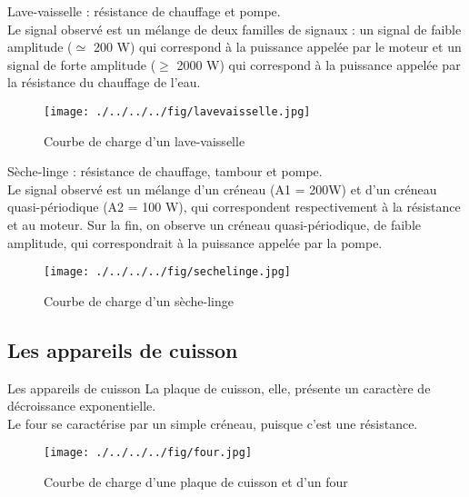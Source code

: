 \documentclass{beamer}
\begin{document}
\begin{frame}
Lave-vaisselle : résistance de chauffage et pompe.\\
\vspace{0.25cm}
Le signal observé est un mélange de deux familles de signaux : un signal de faible amplitude ($\simeq$ 200 W) qui correspond à la puissance appelée par le moteur et un signal de forte amplitude ($\ge$ 2000 W) qui correspond à la puissance appelée par la résistance du chauffage de l'eau.
\begin{figure}[!h]
\begin{center}
\texttt{[image: ./../../../fig/lavevaisselle.jpg]}
\caption{Courbe de charge d'un lave-vaisselle}
\label{Figure10}
\end{center}
\end{figure}
\end{frame}

\begin{frame}
Sèche-linge : résistance de chauffage, tambour et pompe.\\
\vspace{0.25cm}
Le signal observé est un mélange d'un créneau (A1 = 200W) et d'un créneau quasi-périodique (A2 = 100 W), qui correspondent respectivement à la résistance et au moteur. Sur la fin, on observe un créneau quasi-périodique, de faible amplitude, qui correspondrait à la puissance appelée par la pompe.
\begin{figure}[!h]
\begin{center}
\texttt{[image: ./../../../fig/sechelinge.jpg]}
\caption{Courbe de charge d'un sèche-linge}
\label{Figure11}
\end{center}
\end{figure}
\end{frame}

\subsection{Les appareils de cuisson}
\begin{frame}{Les appareils de cuisson}
La plaque de cuisson, elle, présente un caractère de décroissance exponentielle.\\
Le four se caractérise par un simple créneau, puisque c'est une résistance.
\begin{figure}[!h]
\begin{center}
\texttt{[image: ./../../../fig/four.jpg]}
\caption{Courbe de charge d'une plaque de cuisson et d'un four}
\label{Figure12}
\end{center}
\end{figure}
\end{frame}
\end{document}
